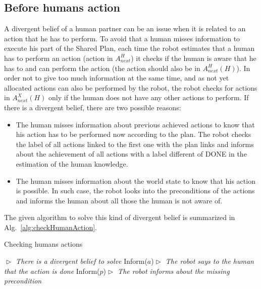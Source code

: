 \documentclass[english,a4paper,11pt,twoside]{StyleThese}
\begin{document}
\subsection{Before humans action}

A divergent belief of a human partner can be an issue when it is related to an action that he has to perform. To avoid that a human misses information to execute his part of the Shared Plan, each time the robot estimates that a human has to perform an action (action in $A^H_{next}$) it checks if the human is aware that he has to and can perform the action (the action should also be in $A^H_{next}(H)$).
In order not to give too much information at the same time, and as not yet allocated actions can also be performed by the robot, the robot checks for actions in $A^X_{next}(H)$ only if the human does not have any other actions to perform. If there is a divergent belief, there are two possible reasons:
\begin{itemize}
\item The human misses information about previous achieved actions to know that his action has to be performed now according to the plan. The robot checks the label of all actions linked to the first one with the plan links and informs about the achievement of all actions with a label different of DONE in the estimation of the human knowledge.
\item The human misses information about the world state to know that his action is possible. In such case, the robot looks into the preconditions of the actions and informs the human about all those the human is not aware of.
\end{itemize}
The given algorithm to solve this kind of divergent belief is summarized in Alg.~\ref{alg:checkHumanAction}.


\begin{algorithm}
\caption{Checking humans actions}
\label{alg:checkHumanAction}
\begin{algorithmic}
\STATE \hfill \textit{$\vartriangleright$ There is a divergent belief to solve}
\STATE Inform($a$)\hfill \textit{$\vartriangleright$ The robot says to the human that the action is done}
\ENDIF
{}
\STATE Inform($p$)\hfill \textit{$\vartriangleright$ The robot informs about the missing precondition}
\ENDIF
\ENDIF
\end{algorithmic}
\end{algorithm} 
\end{document}
